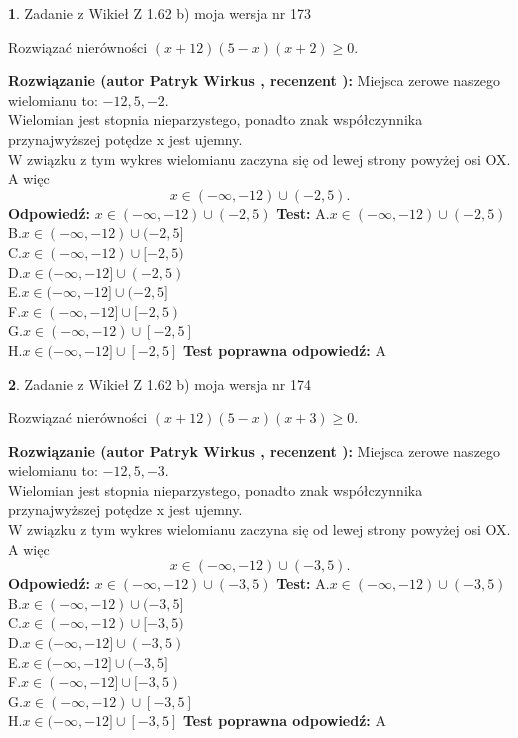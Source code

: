 \documentclass[12pt, a4paper]{article}
\theoremstyle{definition} %
\newtheorem{zad}{}
\newcommand{\zadStart}[1]{\begin{zad}#1\newline}
\newcommand{\zadStop}{\end{zad}}
\newcommand{\rozwStart}[2]{\noindent \textbf{Rozwiązanie (autor #1 , recenzent #2): }\newline}
\newcommand{\rozwStop}{\newline}
\newcommand{\odpStart}{\noindent \textbf{Odpowiedź:}\newline}
\newcommand{\odpStop}{\newline}
\newcommand{\testStart}{\noindent \textbf{Test:}\newline}
\newcommand{\testStop}{\newline}
\newcommand{\kluczStart}{\noindent \textbf{Test poprawna odpowiedź:}\newline}
\newcommand{\kluczStop}{\newline}
\begin{document}
\zadStart{Zadanie z Wikieł Z 1.62 b) moja wersja nr 173}

Rozwiązać nierówności $(x+12)(5-x)(x+2)\ge0$.
\zadStop
\rozwStart{Patryk Wirkus}{}
Miejsca zerowe naszego wielomianu to: $-12, 5, -2$.\\
Wielomian jest stopnia nieparzystego, ponadto znak współczynnika przy\linebreak najwyższej potędze x jest ujemny.\\ W związku z tym wykres wielomianu zaczyna się od lewej strony powyżej osi OX. A więc $$x \in (-\infty,-12) \cup (-2,5).$$
\rozwStop
\odpStart
$x \in (-\infty,-12) \cup (-2,5)$
\odpStop
\testStart
A.$x \in (-\infty,-12) \cup (-2,5)$\\
B.$x \in (-\infty,-12) \cup (-2,5]$\\
C.$x \in (-\infty,-12) \cup [-2,5)$\\
D.$x \in (-\infty,-12] \cup (-2,5)$\\
E.$x \in (-\infty,-12] \cup (-2,5]$\\
F.$x \in (-\infty,-12] \cup [-2,5)$\\
G.$x \in (-\infty,-12) \cup [-2,5]$\\
H.$x \in (-\infty,-12] \cup [-2,5]$
\testStop
\kluczStart
A
\kluczStop



\zadStart{Zadanie z Wikieł Z 1.62 b) moja wersja nr 174}

Rozwiązać nierówności $(x+12)(5-x)(x+3)\ge0$.
\zadStop
\rozwStart{Patryk Wirkus}{}
Miejsca zerowe naszego wielomianu to: $-12, 5, -3$.\\
Wielomian jest stopnia nieparzystego, ponadto znak współczynnika przy\linebreak najwyższej potędze x jest ujemny.\\ W związku z tym wykres wielomianu zaczyna się od lewej strony powyżej osi OX. A więc $$x \in (-\infty,-12) \cup (-3,5).$$
\rozwStop
\odpStart
$x \in (-\infty,-12) \cup (-3,5)$
\odpStop
\testStart
A.$x \in (-\infty,-12) \cup (-3,5)$\\
B.$x \in (-\infty,-12) \cup (-3,5]$\\
C.$x \in (-\infty,-12) \cup [-3,5)$\\
D.$x \in (-\infty,-12] \cup (-3,5)$\\
E.$x \in (-\infty,-12] \cup (-3,5]$\\
F.$x \in (-\infty,-12] \cup [-3,5)$\\
G.$x \in (-\infty,-12) \cup [-3,5]$\\
H.$x \in (-\infty,-12] \cup [-3,5]$
\testStop
\kluczStart
A
\kluczStop
\end{document}
